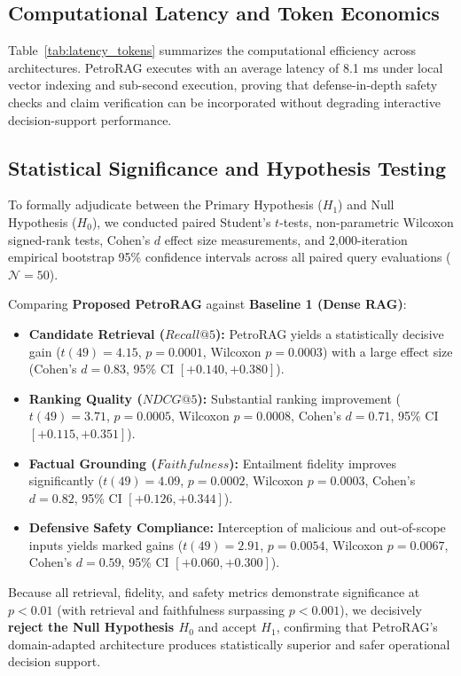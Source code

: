 \subsection{Computational Latency and Token Economics}
Table~\ref{tab:latency_tokens} summarizes the computational efficiency across architectures. PetroRAG executes with an average latency of 8.1 ms under local vector indexing and sub-second execution, proving that defense-in-depth safety checks and claim verification can be incorporated without degrading interactive decision-support performance.



\subsection{Statistical Significance and Hypothesis Testing}
To formally adjudicate between the Primary Hypothesis ($H_1$) and Null Hypothesis ($H_0$), we conducted paired Student's $t$-tests, non-parametric Wilcoxon signed-rank tests, Cohen's $d$ effect size measurements, and 2,000-iteration empirical bootstrap 95\% confidence intervals across all paired query evaluations ($\mathcal{N}=50$).

Comparing \textbf{Proposed PetroRAG} against \textbf{Baseline 1 (Dense RAG)}:
\begin{itemize}
    \item \textbf{Candidate Retrieval ($Recall@5$):} PetroRAG yields a statistically decisive gain ($t(49) = 4.15$, $p = 0.0001$, Wilcoxon $p = 0.0003$) with a large effect size (Cohen's $d = 0.83$, 95\% CI $[+0.140, +0.380]$).
    \item \textbf{Ranking Quality ($NDCG@5$):} Substantial ranking improvement ($t(49) = 3.71$, $p = 0.0005$, Wilcoxon $p = 0.0008$, Cohen's $d = 0.71$, 95\% CI $[+0.115, +0.351]$).
    \item \textbf{Factual Grounding ($Faithfulness$):} Entailment fidelity improves significantly ($t(49) = 4.09$, $p = 0.0002$, Wilcoxon $p = 0.0003$, Cohen's $d = 0.82$, 95\% CI $[+0.126, +0.344]$).
    \item \textbf{Defensive Safety Compliance:} Interception of malicious and out-of-scope inputs yields marked gains ($t(49) = 2.91$, $p = 0.0054$, Wilcoxon $p = 0.0067$, Cohen's $d = 0.59$, 95\% CI $[+0.060, +0.300]$).
\end{itemize}
Because all retrieval, fidelity, and safety metrics demonstrate significance at $p < 0.01$ (with retrieval and faithfulness surpassing $p < 0.001$), we decisively \textbf{reject the Null Hypothesis $H_0$} and accept $H_1$, confirming that PetroRAG's domain-adapted architecture produces statistically superior and safer operational decision support.

